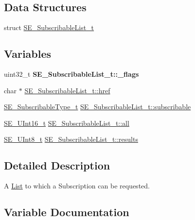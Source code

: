 \subsection*{Data Structures}
\begin{DoxyCompactItemize}
\item 
struct \hyperlink{structSE__SubscribableList__t}{S\+E\+\_\+\+Subscribable\+List\+\_\+t}
\end{DoxyCompactItemize}
\subsection*{Variables}
\begin{DoxyCompactItemize}
\item 
\mbox{\label{group__SubscribableList_ga35fe37f9aa41ebffd8c7fc9d1eb44dd8}} 
uint32\+\_\+t {\bfseries S\+E\+\_\+\+Subscribable\+List\+\_\+t\+::\+\_\+flags}
\item 
char $\ast$ \hyperlink{group__SubscribableList_gae6a8fd9999ba1d8525cd868cb088ea31}{S\+E\+\_\+\+Subscribable\+List\+\_\+t\+::href}
\item 
\hyperlink{group__SubscribableType_ga5c41f553d369710ed34619266bf2551e}{S\+E\+\_\+\+Subscribable\+Type\+\_\+t} \hyperlink{group__SubscribableList_ga3d4a74396a374cf43daaa4fde3f4d4ca}{S\+E\+\_\+\+Subscribable\+List\+\_\+t\+::subscribable}
\item 
\hyperlink{group__UInt16_gac68d541f189538bfd30cfaa712d20d29}{S\+E\+\_\+\+U\+Int16\+\_\+t} \hyperlink{group__SubscribableList_ga7df2805aa87bcfea953995fcf448a13c}{S\+E\+\_\+\+Subscribable\+List\+\_\+t\+::all}
\item 
\hyperlink{group__UInt8_gaf7c365a1acfe204e3a67c16ed44572f5}{S\+E\+\_\+\+U\+Int8\+\_\+t} \hyperlink{group__SubscribableList_ga188bf230efbba4b5cc5b73b8f2ee68b4}{S\+E\+\_\+\+Subscribable\+List\+\_\+t\+::results}
\end{DoxyCompactItemize}


\subsection{Detailed Description}
A \hyperlink{structList}{List} to which a Subscription can be requested. 

\subsection{Variable Documentation}
\mbox{\label{group__SubscribableList_ga7df2805aa87bcfea953995fcf448a13c}} 
